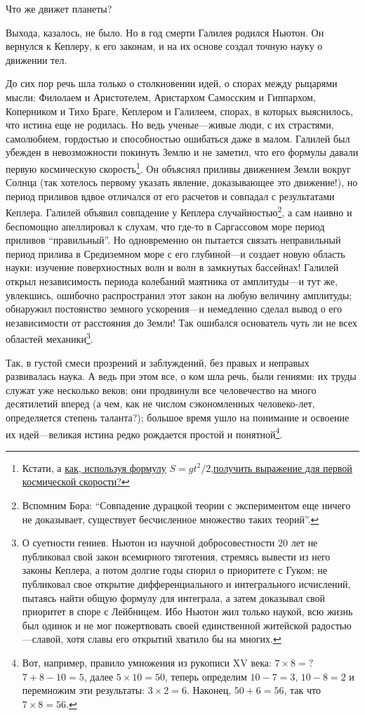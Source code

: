 \documentclass[twocolumn,10pt]{article}
\begin{document}
Что же движет планеты?

Выхода, казалось, не было. Но в год смерти Галилея родился Ньютон. Он вернулся к Кеплеру, к его законам, и на их основе создал точную науку о движении тел.

До сих пор речь шла только о столкновении идей, о спорах между рыцарями мысли: Филолаем и Аристотелем, Аристархом Самосским и Гиппархом, Коперником и Тихо Браге, Кеплером и Галилеем, спорах, в которых выяснилось, что истина еще не родилась. Но ведь ученые---живые люди, с их страстями, самолюбием, гордостью и способностью ошибаться даже в малом. Галилей был убежден в невозможности покинуть Землю и не заметил, что его формулы давали первую космическую скорость\footnote{Кстати, а \uline{как, используя формулу} $S=gt^2 / 2$,\uline{получить выражение для первой космической скорости?}}. Он объяснял приливы движением Земли вокруг Солнца (так хотелось первому указать явление, доказывающее это движение!), но период приливов вдвое отличался от его расчетов и совпадал с результатами Кеплера. Галилей объявил совпадение у Кеплера случайностью\footnote{Вспомним Бора: ``Совпадение дурацкой теории с экспериментом еще ничего не доказывает, существует бесчисленное множество таких теорий''.}, а сам наивно и беспомощно апеллировал к слухам, что где-то в Саргассовом море период приливов ``правильный''. Но одновременно он пытается связать неправильный период прилива в Средиземном море с его глубиной---и создает новую область науки: изучение поверхностных волн и волн в замкнутых бассейнах! Галилей открыл независимость периода колебаний маятника от амплитуды---и тут же, увлекшись, ошибочно распространил этот закон на любую величину амплитуды; обнаружил постоянство земного ускорения---и немедленно сделал вывод о его независимости от расстояния до Земли! Так ошибался основатель чуть ли не всех областей механики\footnote{О суетности гениев. Ньютон из научной добросовестности 20 лет не публиковал свой закон всемирного тяготения, стремясь вывести из него законы Кеплера, а потом долгие годы спорил о приоритете с Гуком; не публиковал свое открытие дифференциального и интегрального исчислений, пытаясь найти общую формулу для интеграла, а затем доказывал свой приоритет в споре с Лейбницем. Ибо Ньютон жил только наукой, всю жизнь был одинок и не мог пожертвовать своей единственной житейской радостью---славой, хотя славы его открытий хватило бы на многих.}.

Так, в густой смеси прозрений и заблуждений, без правых и неправых развивалась наука. А ведь при этом все, о ком шла речь, были гениями: их труды служат уже несколько веков; они продвинули все человечество на много десятилетий вперед (а чем, как не числом сэкономленных человеко-лет, определяется степень таланта?); большое время ушло на понимание и освоение их идей---великая истина редко рождается простой и понятной\footnote{Вот, например, правило умножения из рукописи XV века: $7\times8=?$ $7+8-10=5$, далее $5\times10=50$, теперь определим $10-7=3$, $10-8=2$ и перемножим эти результаты: $3\times2=6$. Наконец, $50+6=56$, так что $7\times8=56$.}.
\end{document}
